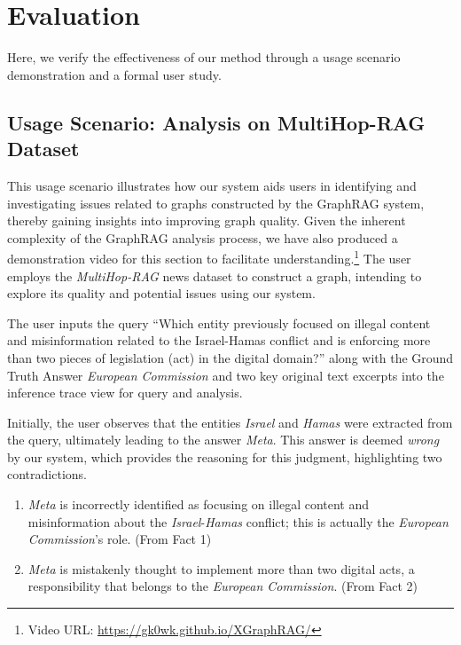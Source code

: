 \section{Evaluation}

Here, we verify the effectiveness of our method through a usage scenario
demonstration and a formal user study.

\subsection{Usage Scenario: Analysis on MultiHop-RAG Dataset}


This usage scenario illustrates how our system aids users in identifying and investigating issues related to graphs constructed by the GraphRAG system, thereby gaining insights into improving graph quality. Given the inherent complexity of the GraphRAG analysis process, we have also produced a demonstration video for this section to facilitate understanding.\footnote{Video URL: \url{https://gk0wk.github.io/XGraphRAG/}} The user employs the \textit{MultiHop-RAG} news dataset \cite{tang2024multihop} to construct a graph, intending to explore its quality and potential issues using our system.

The user inputs the query ``Which entity previously focused on illegal content and misinformation related to the Israel-Hamas conflict and is enforcing more than two pieces of legislation (act) in the digital domain?'' along with the Ground Truth Answer \textit{European Commission} and two key original text excerpts into the inference trace view for query and analysis.

Initially, the user observes that the entities \textit{Israel} and \textit{Hamas} were extracted from the query, ultimately leading to the answer \textit{Meta}. This answer is deemed \textit{wrong} by our system, which provides the reasoning for this judgment, highlighting two contradictions.

\begin{enumerate}
    \item \textit{Meta} is incorrectly identified as focusing on illegal content and misinformation about the \textit{Israel}-\textit{Hamas} conflict; this is actually the \textit{European Commission}'s role. (From Fact 1)
    \item \textit{Meta} is mistakenly thought to implement more than two digital acts, a responsibility that belongs to the \textit{European Commission}. (From Fact 2)
\end{enumerate}

